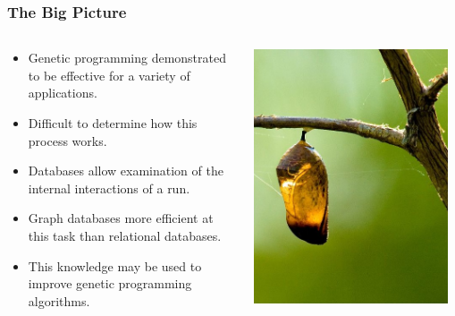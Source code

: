 \documentclass{beamer}
\begin{document}
\begin{frame}
  \frametitle{The Big Picture}
  
  \begin{columns}
  \begin{column}{0.6\textwidth}
  \begin{itemize}
	\item Genetic programming demonstrated to be effective for a variety of applications.
	\item Difficult to determine how this process works.
	\item Databases allow examination of the internal interactions of a run.
	\item Graph databases more efficient at this task than relational databases.
	\item This knowledge may be used to improve genetic programming algorithms.
  \end{itemize}
  \end{column}
  \begin{column}{0.4\textwidth}
   \includegraphics[width=0.95\textwidth]{Illustrations/Empty_cocoon_crop_by_Bluedrakon_from_Flickr.jpg}
       \\
  \end{column}
  \end{columns}
\end{frame}
\end{document}
